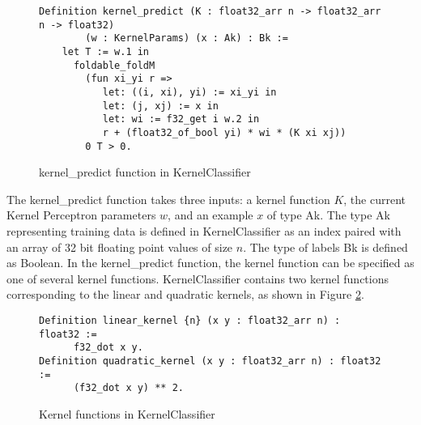 \begin{figure}
    \caption{kernel\_predict function in KernelClassifier}
    \label{kernel_predictDef}
    \begin{lstlisting}
Definition kernel_predict (K : float32_arr n -> float32_arr n -> float32) 
        (w : KernelParams) (x : Ak) : Bk :=
    let T := w.1 in 
      foldable_foldM
        (fun xi_yi r =>
           let: ((i, xi), yi) := xi_yi in
           let: (j, xj) := x in 
           let: wi := f32_get i w.2 in 
           r + (float32_of_bool yi) * wi * (K xi xj))
        0 T > 0.
    \end{lstlisting}
\end{figure}

The kernel\_predict function takes three inputs: a kernel function $K$, the current Kernel Perceptron parameters $w$, and an example $x$ of type Ak. The type Ak representing training data is defined in KernelClassifier as an index paired with an array of 32 bit floating point values of size $n$. The type of labels Bk is defined as Boolean. In the kernel\_predict function, the kernel function can be specified as one of several kernel functions. KernelClassifier contains two kernel functions corresponding to the linear and quadratic kernels, as shown in Figure \ref{kernelfunctionsDef}.

\begin{figure}
    \caption{Kernel functions in KernelClassifier}
    \label{kernelfunctionsDef}
    \begin{lstlisting}
Definition linear_kernel {n} (x y : float32_arr n) : float32 :=
      f32_dot x y.
Definition quadratic_kernel (x y : float32_arr n) : float32 :=
      (f32_dot x y) ** 2.
    \end{lstlisting}
\end{figure}

